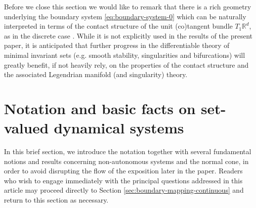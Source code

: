 \documentclass[reqno]{amsart}
\theoremstyle{definition}
\numberwithin{equation}{section}
\begin{document}
Before we close this section we would like to remark that there is a rich geometry underlying the boundary system \eqref{eq:boundary-system-0} which can be naturally interpreted in terms of the contact structure of the unit (co)tangent bundle $T_1\mathbb{R}^d$, as in the discrete case \cite{kourliouros2023persistence}. While it is not explicitly used in the results of the present paper, it is anticipated that further progress in the differentiable theory of minimal invariant sets (e.g. smooth stability, singularities and bifurcations) will greatly benefit, if not heavily rely, on the properties of the contact structure and the associated Legendrian manifold (and singularity) theory.  %



\section{Notation and basic facts on set-valued dynamical systems}
In this brief section, we introduce the notation together with several fundamental notions and results concerning non-autonomous systems and the normal cone, in order to avoid disrupting the flow of the exposition later in the paper. Readers who wish to engage immediately with the principal questions addressed in this article may proceed directly to Section \ref{sec:boundary-mapping-continuous} and return to this section as necessary.
\end{document}

